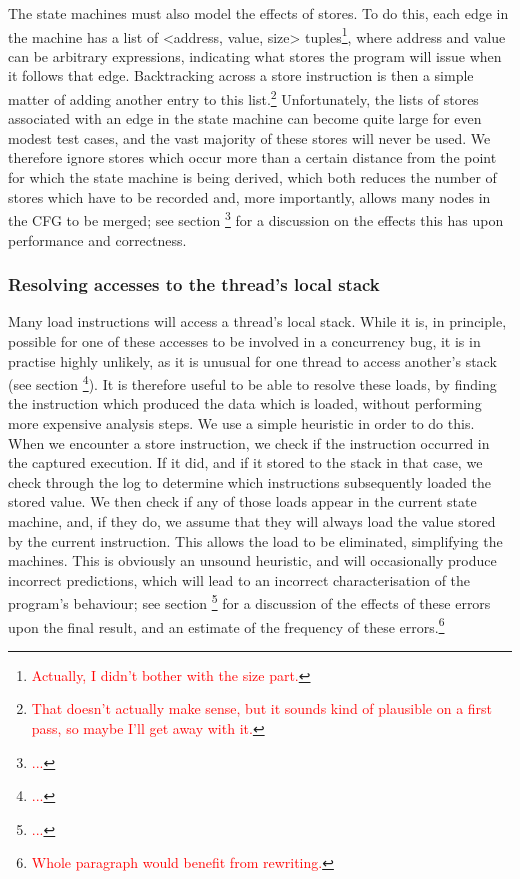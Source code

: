 \documentclass[10pt,twocolumn,preprint,natbib,authoryear]{sigplanconf}
\newcommand{\editorial}[1]{\textcolor{red}{\footnote{\textcolor{red}{#1}}}}
\begin{document}
The state machines must also model the effects of stores.  To do this,
each edge in the machine has a list of <address, value, size>
tuples\editorial{Actually, I didn't bother with the size part.}, where
address and value can be arbitrary expressions, indicating what stores
the program will issue when it follows that edge.  Backtracking across
a store instruction is then a simple matter of adding another entry to
this list.\editorial{That doesn't actually make sense, but it sounds
  kind of plausible on a first pass, so maybe I'll get away with it.}
Unfortunately, the lists of stores associated with an edge in the
state machine can become quite large for even modest test cases, and
the vast majority of these stores will never be used.  We therefore
ignore stores which occur more than a certain distance from the point
for which the state machine is being derived, which both reduces the
number of stores which have to be recorded and, more importantly,
allows many nodes in the CFG to be merged; see section \editorial{...}
for a discussion on the effects this has upon performance and
correctness.

\subsubsection{Resolving accesses to the thread's local stack}

Many load instructions will access a thread's local stack.  While it
is, in principle, possible for one of these accesses to be involved in
a concurrency bug, it is in practise highly unlikely, as it is unusual
for one thread to access another's stack (see section
\editorial{...}).  It is therefore useful to be able to resolve these
loads, by finding the instruction which produced the data which is
loaded, without performing more expensive analysis steps.  We use a
simple heuristic in order to do this.  When we encounter a store
instruction, we check if the instruction occurred in the captured
execution.  If it did, and if it stored to the stack in that case, we
check through the log to determine which instructions subsequently
loaded the stored value.  We then check if any of those loads appear
in the current state machine, and, if they do, we assume that they
will always load the value stored by the current instruction.  This
allows the load to be eliminated, simplifying the machines.  This is
obviously an unsound heuristic, and will occasionally produce
incorrect predictions, which will lead to an incorrect
characterisation of the program's behaviour; see section
\editorial{...}  for a discussion of the effects of these errors upon
the final result, and an estimate of the frequency of these
errors.\editorial{Whole paragraph would benefit from rewriting.}
\end{document}
